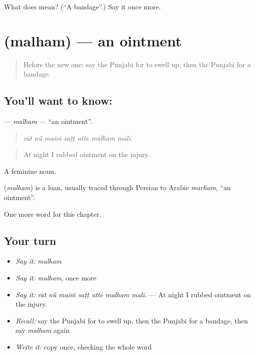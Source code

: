 \begin{tcolorbox}[breakable,colback=teal!4,colframe=teal!35!black,title={Before you move on}]
What does  mean? (\textquotedblleft{}A bandage\textquotedblright{}.) Say it once more.
\end{tcolorbox}
\section[\texorpdfstring{\pa{ਮਲ੍ਹਮ} (malham)}{ਮਲ੍ਹਮ (malham)}]{ (malham) — an ointment}

\label{lesson:PA-C322-malham}



\begin{quote}
Before the new one: say the Punjabi for to swell up, then the Punjabi for a bandage.
\end{quote}

\subsection*{You'll want to know: }
\textbf{} — \emph{malham} — \textquotedblleft{}an ointment\textquotedblright{}.

\begin{quote}
      
\end{quote}

\begin{quote}
\emph{rāt nū̃ maiṁ saṭṭ utte malham malī.}
\end{quote}

\begin{quote}
At night I rubbed ointment on the injury.
\end{quote}

A feminine noun.

\begin{cousinweb}
\textbf{} (\emph{malham}) is a loan, usually traced through Persian to Arabic \emph{marham}, \textquotedblleft{}an ointment\textquotedblright{}.
\end{cousinweb}

\begin{grammarlens}[title={What you've built}]
One more word for this chapter.
\end{grammarlens}

\subsection*{Your turn}
\begin{itemize}
\raggedright
  \item \emph{Say it:} \emph{malham}
  \item \emph{Say it:} \emph{malham}, once more
  \item \emph{Say it:} \emph{rāt nū̃ maiṁ saṭṭ utte malham malī.} — At night I rubbed ointment on the injury.
  \item \emph{Recall:} say the Punjabi for to swell up, then the Punjabi for a bandage, then say \emph{malham} again
  \item \emph{Write it:} copy \textbf{} once, checking the whole word
\end{itemize}

